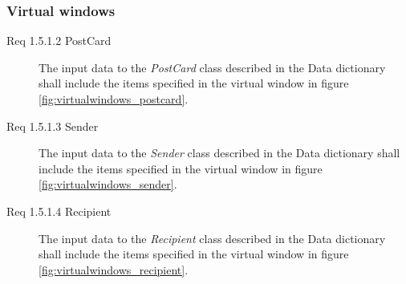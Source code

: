 \documentclass[10pt,a4paper]{article}
\begin{document}
\subsubsection{Virtual windows}
\begin {description}
\item[Req 1.5.1.2 PostCard] The input data to the \textit{PostCard} class described in the Data dictionary shall include the items specified in the virtual window in figure \ref{fig:virtualwindows_postcard}.

\item[Req 1.5.1.3 Sender] The input data to the \textit{Sender} class described in the Data dictionary shall include the items specified in the virtual window in figure \ref{fig:virtualwindows_sender}.

\item[Req 1.5.1.4 Recipient] The input data to the \textit{Recipient} class described in the Data dictionary shall include the items specified in the virtual window in figure \ref{fig:virtualwindows_recipient}.

\end{description}
\hfill
\end{document}
